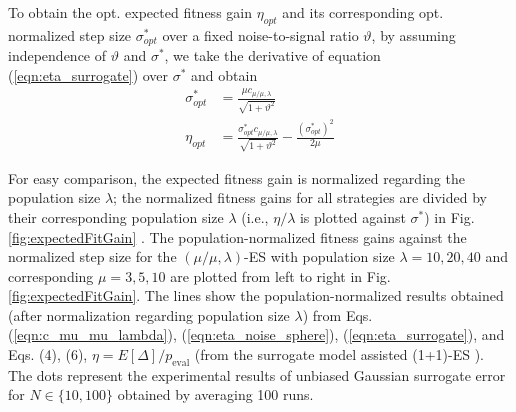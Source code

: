 To obtain the opt. expected fitness gain $\eta_{opt}$ and its corresponding opt. normalized step size $\sigma^*_{opt}$ over a fixed noise-to-signal ratio $\vartheta$, by assuming independence of $\vartheta$ and $\sigma^*$, we take the derivative of equation (\ref{eqn:eta_surrogate}) over $\sigma^*$ and obtain
\begin{align}\label{eqn:opt_surrogate}
\sigma^*_{opt} &= \frac{ \mu c_{\mu / \mu, \lambda}}{\sqrt {1+ \vartheta^2}}\\
\eta_{opt} &= \frac{\sigma^*_{opt} c_{\mu / \mu, \lambda}}{\sqrt {1+ \vartheta^2}} - \frac{(\sigma^*_{opt})^2}{2 \mu} 
\end{align}

 For easy comparison, the expected fitness gain is normalized regarding the population size $\lambda$; the normalized fitness gains for all strategies are divided by their corresponding population size $\lambda$ (i.e., $\eta/\lambda$ is plotted against $\sigma^*$) in Fig. \ref{fig:expectedFitGain} . The population-normalized fitness gains against the normalized step size for the $(\mu/\mu,\lambda)$-ES with population size $\lambda=10,20,40$ and corresponding $\mu=3,5,10$ are plotted from left to right in Fig. \ref{fig:expectedFitGain}. The lines show the population-normalized results obtained (after normalization regarding population size $\lambda$) from Eqs. (\ref{eqn:c_mu_mu_lambda}), (\ref{eqn:eta_noise_sphere}), (\ref{eqn:eta_surrogate}), and Eqs. (4), (6), $\eta = E[\Delta]/p_{\text{eval}}$ (from the surrogate model assisted (1+1)-ES \cite{DBLP:conf/ppsn/KayhaniA18}). The dots represent the experimental results of unbiased Gaussian surrogate error for $N \in \{10,100 \}$ obtained by averaging 100 runs. 


